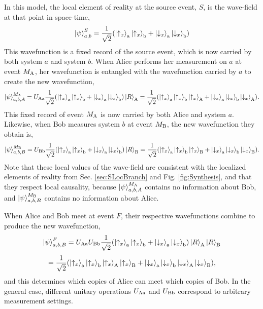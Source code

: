 \documentclass[12pt]{article}
\begin{document}
In this model, the local element of reality at the source event, $S$, is the wave-field at that point in space-time,
 \begin{equation}
\Ket{\psi}^S_{a,b} =\frac{1}{\sqrt 2}(\Ket{\uparrow_x}_{\rm a}\Ket{\uparrow_x}_{\rm b}+
\Ket{\downarrow_x}_{\rm a}\Ket{\downarrow_x}_{\rm b})
\end{equation}
This wavefunction is a fixed record of the source event, which is now carried by both system $a$ and system $b$.  When Alice performs her measurement on $a$ at event $M_{\rm A}$, her wavefunction is entangled with the wavefunction carried by $a$ to create the new wavefunction, 
\begin{equation}
\Ket{\psi}^{M_{\rm A}}_{a,b, A} =U_{\rm Aa} \frac{1}{\sqrt 2}(\Ket{\uparrow_x}_{\rm a}\Ket{\uparrow_x}_{\rm b}+
\Ket{\downarrow_x}_{\rm a}\Ket{\downarrow_x}_{\rm b})\Ket{R}_{\rm A} = \frac{1}{\sqrt 2}(\Ket{\uparrow_x}_{\rm a}\Ket{\uparrow_x}_{\rm b}\Ket{\uparrow_x}_{\rm A}+
\Ket{\downarrow_x}_{\rm a}\Ket{\downarrow_x}_{\rm b}\Ket{\downarrow_x}_{\rm A}).
\end{equation}
This fixed record of event $M_{\rm A}$ is now carried by both Alice and system $a$.  Likewise, when Bob measures system $b$ at event $M_{\rm B}$, the new wavefunction they obtain is, 
\begin{equation}
\Ket{\psi}^{M_{\rm B}}_{a,b, B} =U_{\rm Bb} \frac{1}{\sqrt 2}(\Ket{\uparrow_x}_{\rm a}\Ket{\uparrow_x}_{\rm b}+
\Ket{\downarrow_x}_{\rm a}\Ket{\downarrow_x}_{\rm b})\Ket{R}_{\rm B} = \frac{1}{\sqrt 2}(\Ket{\uparrow_x}_{\rm a}\Ket{\uparrow_x}_{\rm b}\Ket{\uparrow_x}_{\rm B}+
\Ket{\downarrow_x}_{\rm a}\Ket{\downarrow_x}_{\rm b}\Ket{\downarrow_x}_{\rm B}).
\end{equation}
Note that these local values of the wave-field are consistent with the localized elements of reality from Sec. \ref{sec:SLocBranch} and Fig. \ref{fig:Synthesis}, and that they respect local causality, because $\Ket{\psi}^{M_{\rm A}}_{a,b, A}$ contains no information about Bob, and $\Ket{\psi}^{M_{\rm B}}_{a,b, B}$ contains no information about Alice.

When Alice and Bob meet at event $F$, their respective wavefunctions combine to produce the new wavefunction,
\begin{equation}
\Ket{\psi}^{F}_{a,b, B} =U_{\rm Aa}U_{\rm Bb} \frac{1}{\sqrt 2}(\Ket{\uparrow_x}_{\rm a}\Ket{\uparrow_x}_{\rm b}+
\Ket{\downarrow_x}_{\rm a}\Ket{\downarrow_x}_{\rm b})\Ket{R}_{\rm A}\Ket{R}_{\rm B} \label{PsiF}
\end{equation}
\begin{equation}
= \frac{1}{\sqrt 2}(\Ket{\uparrow_x}_{\rm a}\Ket{\uparrow_x}_{\rm b}\Ket{\uparrow_x}_{\rm A}\Ket{\uparrow_x}_{\rm B}+
\Ket{\downarrow_x}_{\rm a}\Ket{\downarrow_x}_{\rm b}\Ket{\downarrow_x}_{\rm A}\Ket{\downarrow_x}_{\rm B}),\nonumber
\end{equation}
and this determines which copies of Alice can meet which copies of Bob.  In the general case, different unitary operations $U_{\rm Aa}$ and $U_{\rm Bb}$ correspond to arbitrary measurement settings.
\end{document}
